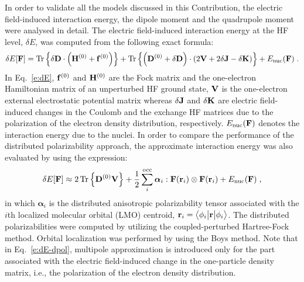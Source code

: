 \documentclass[aip,graphicx]{revtex4-1}
\newcommand{\tbraket}[3]{\ensuremath{\bigl\langle {#1} \bigl\lvert {#2} \bigl\lvert {#3} \bigr\rangle}}
\newcommand{\BM}[1]{\bm{#1}}
\DeclareMathOperator{\Tr}{Tr}
\begin{document}
In order to validate all the models discussed in this Contribution,
the electric field\hyp{}induced interaction energy, 
the dipole moment and the quadrupole moment were analysed in detail.
The electric field\hyp{}induced interaction energy at the HF level, $\delta E$,
was computed from the following exact formula:
%
\begin{multline}\label{e:dE}
 \delta E[{\bf F}] = 
                     \Tr{\left\{ \delta {\bf D} \cdot
                                \left( {\bf H}^{(0)} + {\bf f}^{(0)} \right) \right\}}
                   + \Tr{\left\{ \left( {\bf D}^{(0)} + \delta {\bf D} \right) \cdot
                                \left( 2{\bf V} + 2\delta {\bf J} - \delta {\bf K}\right) \right\}} 
                   + E_{\rm nuc}({\bf F}) \;.
\end{multline}
%
In Eq.~\eqref{e:dE}, ${\bf f}^{(0)}$ and ${\bf H}^{(0)}$ are the Fock matrix and 
the one\hyp{}electron Hamiltonian matrix of an unperturbed HF ground state,
${\bf V}$ is the one\hyp{}electron external electrostatic potential matrix whereas $\delta {\bf J}$
and $\delta {\bf K}$ are electric field\hyp{}induced changes in the Coulomb and the exchange HF matrices due to 
the polarization of the electron density distribution, respectively. $E_{\rm nuc}({\bf F})$ denotes the interaction energy
due to the nuclei.
In order to compare the performance of the distributed polarizability approach,
the approximate interaction energy was also evaluated by using the expression:
%
\begin{equation}\label{e:dE-dpol}
 \delta E[{\bf F}] \approx 2 \Tr{\left\{ {\bf D}^{(0)} {\bf V}\right\} } 
                   + \frac{1}{2} \sum_i^{\rm occ} {\BM \alpha}_i : {\bf F}({\bf r}_i) \otimes {\bf F}({\bf r}_i)
                   + E_{\rm nuc}({\bf F}) \;,
\end{equation}
%
in which ${\BM \alpha}_i$ is the distributed anisotropic polarizability tensor associated with the
$i$th localized molecular orbital (LMO) centroid, ${\bf r}_i = \tbraket{\phi_i}{\bf r}{\phi_i}$.
The distributed polarizabilities were computed by utilizing the coupled\hyp{}perturbed Hartree\hyp{}Fock
method. Orbital localization was performed by using the Boys method. Note that in Eq.~\eqref{e:dE-dpol}, 
multipole approximation is introduced only for the part associated with the electric field\hyp{}induced
change in the one\hyp{}particle density matrix, i.e., the polarization of the electron density distribution.
\end{document}
